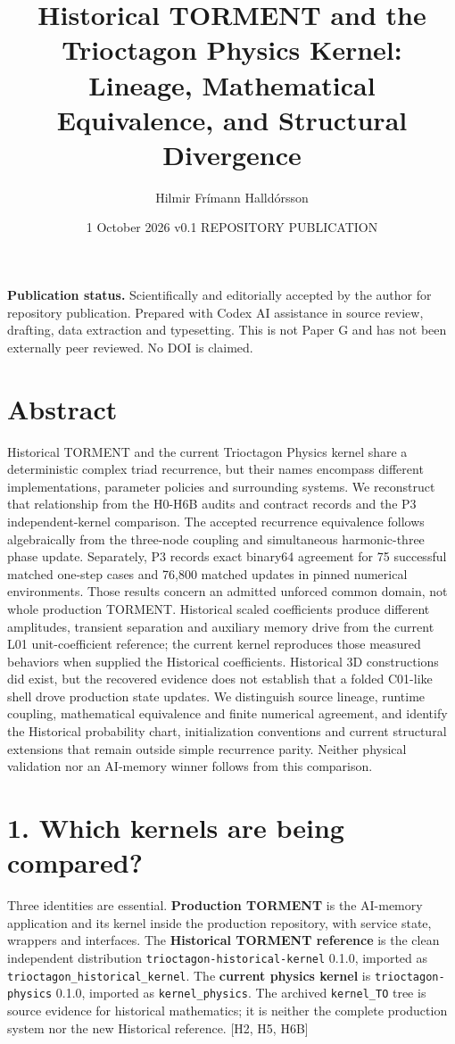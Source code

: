 \documentclass[
  11pt,
  a4paper,
]{article}
\title{Historical TORMENT and the Trioctagon Physics Kernel: Lineage, Mathematical Equivalence, and Structural Divergence}
\author{Hilmir Frímann Halldórsson}
\date{1 October 2026 \textbar{} v0.1 REPOSITORY PUBLICATION}
\begin{document}
\maketitle

\textbf{Publication status.} Scientifically and editorially accepted by the author for repository publication. Prepared with Codex AI assistance in source review, drafting, data extraction and typesetting. This is not Paper G and has not been externally peer reviewed. No DOI is claimed.

\section{Abstract}\label{abstract}

Historical TORMENT and the current Trioctagon Physics kernel share a deterministic complex triad recurrence, but their names encompass different implementations, parameter policies and surrounding systems. We reconstruct that relationship from the H0-H6B audits and contract records and the P3 independent-kernel comparison. The accepted recurrence equivalence follows algebraically from the three-node coupling and simultaneous harmonic-three phase update. Separately, P3 records exact binary64 agreement for 75 successful matched one-step cases and 76,800 matched updates in pinned numerical environments. Those results concern an admitted unforced common domain, not whole production TORMENT. Historical scaled coefficients produce different amplitudes, transient separation and auxiliary memory drive from the current L01 unit-coefficient reference; the current kernel reproduces those measured behaviors when supplied the Historical coefficients. Historical 3D constructions did exist, but the recovered evidence does not establish that a folded C01-like shell drove production state updates. We distinguish source lineage, runtime coupling, mathematical equivalence and finite numerical agreement, and identify the Historical probability chart, initialization conventions and current structural extensions that remain outside simple recurrence parity. Neither physical validation nor an AI-memory winner follows from this comparison.

\section{1. Which kernels are being compared?}\label{which-kernels-are-being-compared}

Three identities are essential. \textbf{Production TORMENT} is the AI-memory application and its kernel inside the production repository, with service state, wrappers and interfaces. The \textbf{Historical TORMENT reference} is the clean independent distribution \nolinkurl{trioctagon-historical-kernel} 0.1.0, imported as \nolinkurl{trioctagon_historical_kernel}. The \textbf{current physics kernel} is \texttt{trioctagon-physics} 0.1.0, imported as \texttt{kernel\_physics}. The archived \texttt{kernel\_TO} tree is source evidence for historical mathematics; it is neither the complete production system nor the new Historical reference. {[}H2, H5, H6B{]}
\end{document}
